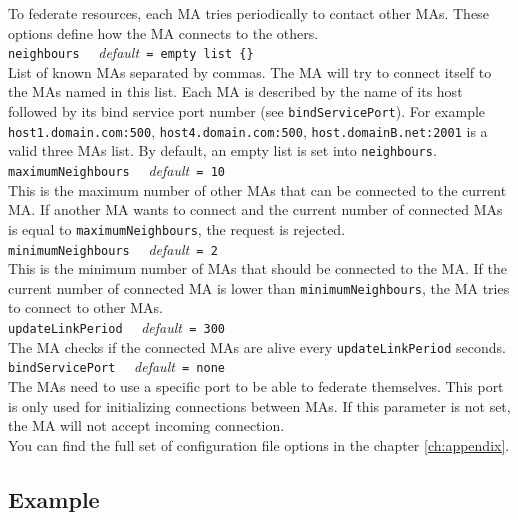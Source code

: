 To federate resources, each MA tries periodically to contact other MAs. These
options define how the MA connects to the others.\\

\noindent
\texttt{neighbours} \ \ \emph{default}\texttt{ = empty list \{\}}\\ List of
known MAs separated by commas. The MA will try to connect itself to the MAs
named in this list. Each MA is described by the name of its host followed by
its bind service port number (see \texttt{bindServicePort}). For example
\texttt{host1.domain.com:500}, \texttt{host4.domain.com:500},
\texttt{host.domainB.net:2001} is a valid three MAs list. By default, an empty
list is set into \texttt{neighbours}.\\

\noindent
\texttt{maximumNeighbours} \ \ \emph{default}\texttt{ = 10}\\ This is the
maximum number of other MAs that can be connected to the current MA.  If
another MA wants to connect and the current number of connected MAs is equal to
\texttt{maximumNeighbours}, the request is rejected.\\

\noindent
\texttt{minimumNeighbours} \ \ \emph{default}\texttt{ = 2}\\ This is the
minimum number of MAs that should be connected to the MA. If the current number
of connected MA is lower than \texttt{minimumNeighbours}, the MA tries to
connect to other MAs.\\

\noindent
\texttt{updateLinkPeriod} \ \ \emph{default}\texttt{ = 300}\\ The MA checks if
the connected MAs are alive every \texttt{updateLinkPeriod} seconds.\\

\noindent
\texttt{bindServicePort} \ \ \emph{default}\texttt{ = none}\\ The MAs need to
use a specific port to be able to federate themselves. This port is only used
for initializing connections between MAs. If this parameter is not set, the MA
will not accept incoming connection.\\

You can find the full set of \diet configuration file options in the chapter
\ref{ch:appendix}.

\subsection{Example}
\label{sec:deploy_ex}

